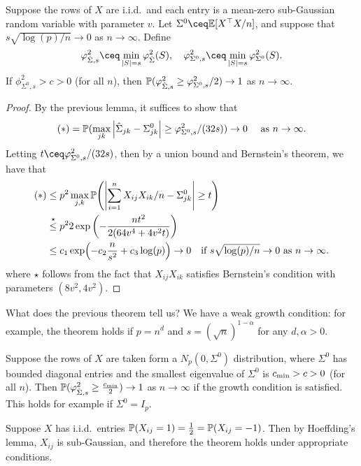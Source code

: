 \begin{theorem} \label{thm:lasso_compatibility_condition_asymptotics}
	Suppose the rows of $X$ are i.i.d.\ and each entry is a mean-zero sub-Gaussian random variable with parameter $v$. Let $\Sigma^0 \ceq\EE[X\T X/n]$, and suppose that $s \sqrt{\log(p)/n} \to 0$ as $n\to\infty$. Define
	\[
	\phi^2_{\hat\Sigma, s} \ceq \min_{\abs{S} = s} \phi_{\hat\Sigma}^2(S), \quad \phi_{\Sigma^0, s}^2 \ceq \min_{\abs{S} = s} \phi_{\Sigma^0}^2(S). 
	\]
	If $\phi_{\Sigma^0, s}^2 > c > 0$ (for all $n$), then $\mathbb P(\varphi_{\hat\Sigma, s}^2 \geq \varphi_{\Sigma^0, s}^2/2) \to 1$ as $n\to\infty$. 
\end{theorem}

\begin{proof}
	By the previous lemma, it suffices to show that 
	\[
	(*) = \mathbb P(\max_{jk}\abs{\hat\Sigma_{jk} - \Sigma^0_{jk}} \geq \varphi_{\Sigma^0, s}^2 / (32s)) \to 0 \quad\text{ as } n \to\infty. 
	\]
	Letting $t \ceq \phi_{\Sigma^0, s}^2/(32s)$, then 
	by a union bound and Bernstein's theorem, we have that 
	\begin{align*}
	(*) &\leq p^2 \max_{j, k} \mathbb P\qty(\abs{\sum_{i=1}^n X_{ij} X_{ik}/n - \Sigma^0_{jk}} \geq t) \\
	&\overset\star\leq p^2 2 \exp\qty(-\frac{nt^2}{2(64 v^4 + 4v^2 t)}) \\
	&\leq c_1 \exp(-c_2 \frac{n}{s^2} + c_3 \log(p)) \to 0 \quad\text{if $s \sqrt{\log(p)/n} \to 0$ as $n\to\infty$}. 
	\end{align*}
where $\star$ follows from the fact that $X_{ij}X_{ik}$ satisfies Bernstein's condition with parameters $(8v^2, 4v^2)$. 
\end{proof}

What does the previous theorem tell us? We have a weak growth condition: for example, the theorem holds if $p = n^d$ and $s = (\sqrt n)^{1 -\alpha}$ for any $d, \alpha > 0$. 

\begin{example}
	Suppose the rows of $X$ are taken form a $N_p(0, \Sigma^0)$ distribution, where $\Sigma^0$ has bounded diagonal entries and the smallest eigenvalue of $\Sigma^0$ is $c_\mathrm{min} > c > 0$ (for all $n$). Then $\mathbb P(\varphi_{\hat\Sigma, s}^2 \geq \frac{c_\mathrm{min}}{2}) \to 1$ as $n\to\infty$ if the growth condition is satisfied. This holds for example if $\Sigma^0 = I_p$. 
\end{example}

\begin{example}
	Suppose $X$ has i.i.d.\ entries $\mathbb P(X_{ij} = 1) = \frac12 = \mathbb P(X_{ij} = -1)$. Then by Hoeffding's lemma, $X_{ij}$ is sub-Gaussian, and therefore the theorem holds under appropriate conditions. 
\end{example}

